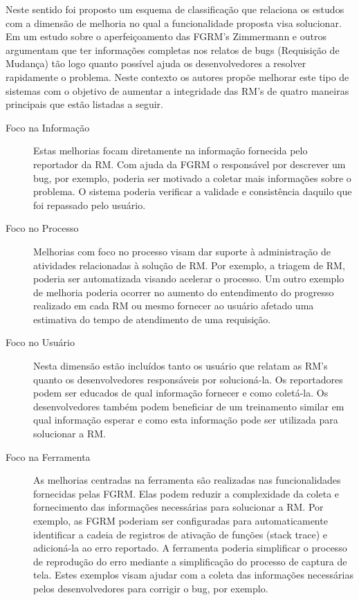 Neste sentido foi proposto um esquema de classificação que relaciona os estudos
com a dimensão de melhoria no qual a funcionalidade proposta visa solucionar. Em
um estudo sobre o aperfeiçoamento das FGRM's Zimmermann e
outros~\cite{zimmermann2009improving} argumentam que ter informações completas
nos relatos de bugs (Requisição de Mudança) tão logo quanto possível ajuda os
desenvolvedores a resolver rapidamente o problema. Neste contexto os autores
propõe melhorar este tipo de sistemas com o objetivo de aumentar a integridade
das RM's de quatro maneiras principais que estão listadas a seguir.

\begin{description}
	\item[Foco na Informação] Estas melhorias focam diretamente na informação
		fornecida pelo reportador da RM\@. Com ajuda da FGRM o responsável por
		descrever um bug, por exemplo, poderia ser motivado a coletar mais
		informações sobre o problema. O sistema poderia verificar a validade e
		consistência daquilo que foi repassado pelo usuário.
   \item[Foco no Processo] Melhorias com foco no processo visam dar suporte à
	   administração de atividades relacionadas à solução de RM\@. Por exemplo,
	   a triagem de RM, poderia ser automatizada visando acelerar o processo. Um
	   outro exemplo de melhoria poderia ocorrer no aumento do entendimento do
	   progresso realizado em cada RM ou mesmo fornecer ao usuário afetado uma
	   estimativa do tempo de atendimento de uma requisição.
   \item[Foco no Usuário] Nesta dimensão estão incluídos tanto os usuário que
	   relatam as RM's quanto os desenvolvedores responsáveis por solucioná-la.
	   Os reportadores podem ser educados de qual informação fornecer e como
	   coletá-la. Os desenvolvedores também podem beneficiar de um treinamento
	   similar em qual informação esperar e como esta informação pode ser
	   utilizada para solucionar a RM\@.
	\item[Foco na Ferramenta] As melhorias centradas na ferramenta são
		realizadas nas funcionalidades fornecidas pelas FGRM\@. Elas podem
		reduzir a complexidade da coleta e fornecimento das informações
		necessárias para solucionar a RM\@. Por exemplo, as FGRM poderiam ser
		configuradas para automaticamente identificar a cadeia de registros de
		ativação de funções (stack trace) e adicioná-la ao erro reportado.  A
		ferramenta poderia simplificar o processo de reprodução do erro mediante
		a simplificação do processo de captura de tela. Estes exemplos visam
		ajudar com a coleta das informações necessárias pelos desenvolvedores
		para corrigir o bug, por exemplo.
\end{description}
